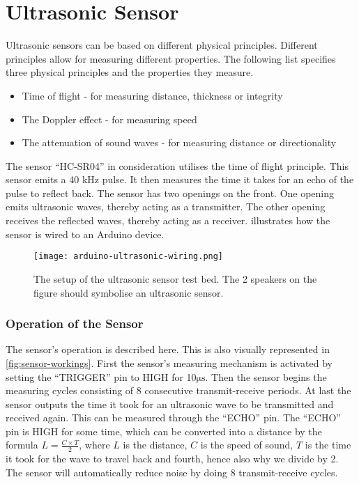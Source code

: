 \section{Ultrasonic Sensor}\label{sub:ultrasonic}

Ultrasonic sensors can be based on different physical principles. Different principles allow for measuring different properties. The following list specifies three physical principles and the properties they measure.

\begin{itemize}
  \item Time of flight - for measuring distance, thickness or integrity\cite{ultrasound2}
  \item The Doppler effect - for measuring speed\cite{ultrasound}
  \item The attenuation of sound waves - for measuring distance or directionality\cite{ultrasound}
\end{itemize}

The sensor \enquote{HC-SR04} in consideration utilises the time of flight principle. This sensor emits a 40 kHz pulse. It then measures the time it takes for an echo of the pulse to reflect back. The sensor has two openings on the front. One opening emits ultrasonic waves, thereby acting as a transmitter. The other opening receives the reflected waves, thereby acting as a receiver.  illustrates how the sensor is wired to an Arduino device.

\begin{figure}[htbp]
  \centering
  \texttt{[image: arduino-ultrasonic-wiring.png]}
  \caption[The setup of the ultrasonic sensor test bed]{The setup of the ultrasonic sensor test bed. The 2 speakers on the figure should symbolise an ultrasonic sensor.}\label{fig:ultrasonicwiring}
\end{figure}

\subsubsection{Operation of the Sensor}
The sensor's operation is described here. This is also visually represented in \cref{fig:sensor-workings}. First the sensor's measuring mechanism is activated by setting the \enquote{TRIGGER} pin to HIGH for 10$\si{\micro\second}$. Then the sensor begins the measuring cycles consisting of 8 consecutive transmit-receive periods. At last the sensor outputs the time it took for an ultrasonic wave to be transmitted and received again. This can be measured through the \enquote{ECHO} pin. The \enquote{ECHO} pin is HIGH for some time, which can be converted into a distance by the formula $L = \frac{C \times T}{2}$, where $L$ is the distance, $C$ is the speed of sound, $T$ is the time it took for the wave to travel back and fourth, hence also why we divide by 2. The sensor will automatically reduce noise by doing 8 transmit-receive cycles.

